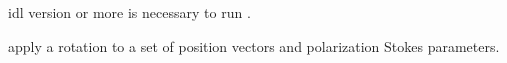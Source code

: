 \begin{related}
  \begin{sulist}{} %
    \item[idl] version \idlversion or more is necessary to run \thedocid.
    \item[\htmlref{rotate\_coord}{idl:rotate_coord}] apply a rotation to a set of position vectors and
    polarization Stokes parameters.
  \end{sulist}
\end{related}



